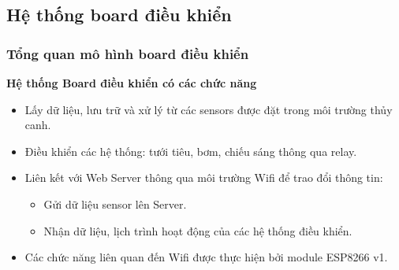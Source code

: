 \documentclass[a4paper,12pt,oneside]{article}
\begin{document}
\subsection{Hệ thống board điều khiển}

\subsubsection{Tổng quan mô hình board điều khiển}

\noindent \textbf{Hệ thống Board điều khiển có các chức năng}
\begin{itemize}
\item Lấy dữ liệu, lưu trữ và xử lý từ các sensors được đặt trong môi trường thủy canh.
\item Điều khiển các hệ thống: tưới tiêu, bơm, chiếu sáng thông qua relay.
\item Liên kết với Web Server thông qua môi trường Wifi để trao đổi thông tin:
\begin{itemize}
\item Gửi dữ liệu sensor lên Server.
\item Nhận dữ liệu, lịch trình hoạt động của các hệ thống điều khiển.
\end{itemize}

\item Các chức năng liên quan đến Wifi được thực hiện bởi module ESP8266 v1.
\end{itemize}
\end{document}
